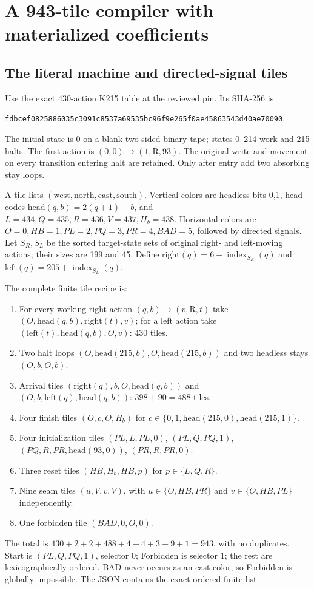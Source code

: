 \documentclass[11pt]{article}
\newcommand{\sha}[1]{\texttt{\small #1}}
\begin{document}
\section{A 943-tile compiler with materialized coefficients}\label{sec:coeff}

\subsection{The literal machine and directed-signal tiles}
Use the exact 430-action K215 table at the reviewed pin. Its SHA-256 is
\begin{center}\sha{fdbcef0825886035c3091c8537a69535bc96f9e265f0ae45863543d40ae70090}.\end{center}
The initial state is 0 on a blank two-sided binary tape; states 0--214 work and 215 halts. The first action is $(0,0)\mapsto(1,\mathrm R,93)$. The original write and movement on every transition entering halt are retained. Only after entry add two absorbing stay loops.

A tile lists $(\mathrm{west},\mathrm{north},\mathrm{east},\mathrm{south})$. Vertical colors are headless bits 0,1, head codes $\mathrm{head}(q,b)=2(q+1)+b$, and $L=434,Q=435,R=436,V=437,H_b=438$. Horizontal colors are $O=0,HB=1,PL=2,PQ=3,PR=4,BAD=5$, followed by directed signals. Let $S_R,S_L$ be the sorted target-state sets of original right- and left-moving actions; their sizes are 199 and 45. Define $\mathrm{right}(q)=6+\operatorname{index}_{S_R}(q)$ and $\mathrm{left}(q)=205+\operatorname{index}_{S_L}(q)$.

The complete finite tile recipe is:
\begin{enumerate}
\item For every working right action $(q,b)\mapsto(v,\mathrm R,t)$ take $(O,\mathrm{head}(q,b),\mathrm{right}(t),v)$; for a left action take $(\mathrm{left}(t),\mathrm{head}(q,b),O,v)$: 430 tiles.
\item Two halt loops $(O,\mathrm{head}(215,b),O,\mathrm{head}(215,b))$ and two headless stays $(O,b,O,b)$.
\item Arrival tiles $(\mathrm{right}(q),b,O,\mathrm{head}(q,b))$ and $(O,b,\mathrm{left}(q),\mathrm{head}(q,b))$: $398+90=488$ tiles.
\item Four finish tiles $(O,c,O,H_b)$ for $c\in\{0,1,\mathrm{head}(215,0),\mathrm{head}(215,1)\}$.
\item Four initialization tiles $(PL,L,PL,0)$, $(PL,Q,PQ,1)$, $(PQ,R,PR,\mathrm{head}(93,0))$, $(PR,R,PR,0)$.
\item Three reset tiles $(HB,H_b,HB,p)$ for $p\in\{L,Q,R\}$.
\item Nine seam tiles $(u,V,v,V)$, with $u\in\{O,HB,PR\}$ and $v\in\{O,HB,PL\}$ independently.
\item One forbidden tile $(BAD,0,O,0)$.
\end{enumerate}
The total is $430+2+2+488+4+4+3+9+1=943$, with no duplicates. Start is $(PL,Q,PQ,1)$, selector 0; Forbidden is selector 1; the rest are lexicographically ordered. BAD never occurs as an east color, so Forbidden is globally impossible. The JSON contains the exact ordered finite list.
\end{document}
